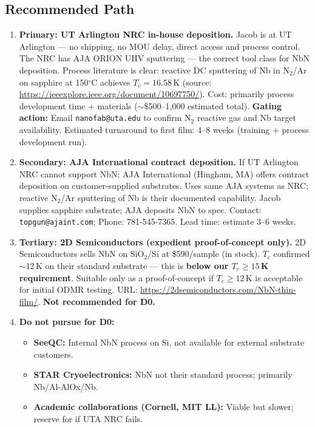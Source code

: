 \subsection{Recommended Path}
\label{sec:nbn_path}

\begin{enumerate}
  \item \textbf{Primary: UT Arlington NRC in-house deposition.}
    Jacob is at UT Arlington --- no shipping, no MOU delay, direct access and process control.
    The NRC has AJA ORION UHV sputtering --- the correct tool class for NbN deposition.
    Process literature is clear: reactive DC sputtering of Nb in N$_2$/Ar on sapphire at 150$^\circ$C
    achieves $T_c = 16.58$\,K (source: \url{https://ieeexplore.ieee.org/document/10697750/}).
    Cost: primarily process development time + materials ($\sim$\$500--1,000 estimated total).
    \textbf{Gating action:} Email \texttt{nanofab@uta.edu} to confirm N$_2$ reactive gas and
    Nb target availability. Estimated turnaround to first film: 4--8 weeks (training + process
    development run).

  \item \textbf{Secondary: AJA International contract deposition.}
    If UT Arlington NRC cannot support NbN:
    AJA International (Hingham, MA) offers contract deposition on customer-supplied substrates.
    Uses same AJA systems as NRC; reactive N$_2$/Ar sputtering of Nb is their documented capability.
    Jacob supplies sapphire substrate; AJA deposits NbN to spec.
    Contact: \texttt{topgun@ajaint.com}; Phone: 781-545-7365. Lead time: estimate 3--6 weeks.

  \item \textbf{Tertiary: 2D Semiconductors (expedient proof-of-concept only).}
    2D Semiconductors sells NbN on SiO$_2$/Si at \$590/sample (in stock).
    $T_c$ confirmed $\sim$12\,K on their standard substrate --- this is \textbf{below our
    $T_c \geq 15$\,K requirement}.
    Suitable only as a proof-of-concept if $T_c \geq 12$\,K is acceptable for initial ODMR testing.
    URL: \url{https://2dsemiconductors.com/NbN-thin-film/}.
    \textbf{Not recommended for D0.}

  \item \textbf{Do not pursue for D0:}
    \begin{itemize}
      \item \textbf{SeeQC:} Internal NbN process on Si, not available for external substrate customers.
      \item \textbf{STAR Cryoelectronics:} NbN not their standard process; primarily Nb/Al-AlOx/Nb.
      \item \textbf{Academic collaborations (Cornell, MIT LL):} Viable but slower;
        reserve for if UTA NRC fails.
    \end{itemize}
\end{enumerate}

